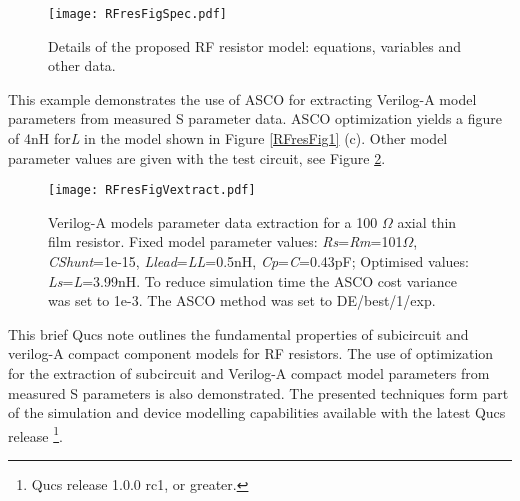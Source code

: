 \begin{figure}[h]
\begin{center}
	\texttt{[image: RFresFigSpec.pdf]}
	\caption{Details of the proposed RF resistor model: equations, variables and other data.}                                                                                                                                                                             	\label{RFresFigSpec}
\end{center}
\end{figure}
This example demonstrates the use of ASCO for extracting Verilog-A model parameters from measured S parameter data.
ASCO optimization yields a figure of 4nH for\textit{L} in the model shown in Figure \ref{RFresFig1} (c). Other model
parameter values are given with the test circuit, see Figure \ref{RFresVextract}.
\begin{figure}[h]
\begin{center}
	\texttt{[image: RFresFigVextract.pdf]}
	\caption{Verilog-A models parameter data extraction for a 100 $\Omega$ axial thin film resistor. Fixed model parameter values:
	 \textit{Rs}=\textit{Rm}=101$\Omega$, \textit{CShunt}=1e-15, \textit{Llead}=\textit{LL}=0.5nH, \textit{Cp}=\textit{C}=0.43pF;
	  Optimised values: \textit{Ls}=\textit{L}=3.99nH.
	  To reduce simulation time the ASCO cost variance was set to 1e-3. The ASCO method was set to DE/best/1/exp.}
	\label{RFresVextract}
\end{center}
\end{figure}
This brief Qucs note outlines the fundamental properties of subicircuit and verilog-A compact component models for RF resistors.
The use of optimization for the extraction of subcircuit and Verilog-A compact model parameters
from measured S parameters is also demonstrated.
The presented techniques form part of the simulation and device modelling capabilities available with the
latest Qucs release \footnote{Qucs release 1.0.0 rc1, or greater.}.


